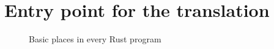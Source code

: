\section{Entry point for the translation}

\begin{figure}[!htb]
  \centering
  
  \caption{Basic places in every Rust program}
  \label{fig:program-places}
\end{figure}